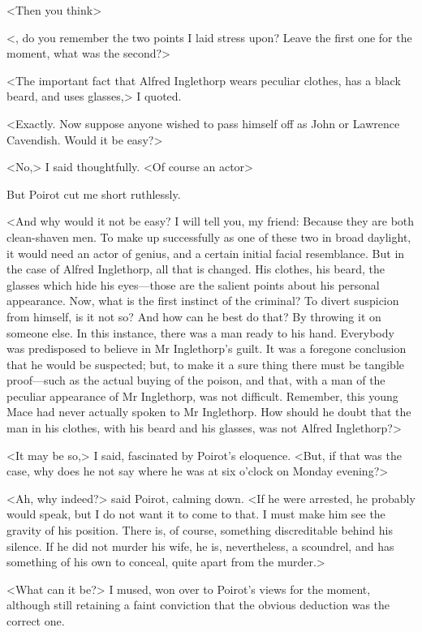  <Then you think\longdash> 

 <, do you remember the two points I laid stress upon? Leave the first one for the moment, what was the second?> 

 <The important fact that Alfred Inglethorp wears peculiar clothes, has a black beard, and uses glasses,> I quoted. 

 <Exactly. Now suppose anyone wished to pass himself off as John or Lawrence Cavendish. Would it be easy?> 

 <No,> I said thoughtfully. <Of course an actor\longdash> 

 But Poirot cut me short ruthlessly. 

 <And why would it not be easy? I will tell you, my friend: Because they are both clean-shaven men. To make up successfully as one of these two in broad daylight, it would need an actor of genius, and a certain initial facial resemblance. But in the case of Alfred Inglethorp, all that is changed. His clothes, his beard, the glasses which hide his eyes—those are the salient points about his personal appearance. Now, what is the first instinct of the criminal? To divert suspicion from himself, is it not so? And how can he best do that? By throwing it on someone else. In this instance, there was a man ready to his hand. Everybody was predisposed to believe in Mr Inglethorp's guilt. It was a foregone conclusion that he would be suspected; but, to make it a sure thing there must be tangible proof—such as the actual buying of the poison, and that, with a man of the peculiar appearance of Mr Inglethorp, was not difficult. Remember, this young Mace had never actually spoken to Mr Inglethorp. How should he doubt that the man in his clothes, with his beard and his glasses, was not Alfred Inglethorp?> 

 <It may be so,> I said, fascinated by Poirot's eloquence. <But, if that was the case, why does he not say where he was at six o'clock on Monday evening?> 

 <Ah, why indeed?> said Poirot, calming down. <If he were arrested, he probably would speak, but I do not want it to come to that. I must make him see the gravity of his position. There is, of course, something discreditable behind his silence. If he did not murder his wife, he is, nevertheless, a scoundrel, and has something of his own to conceal, quite apart from the murder.> 

 <What can it be?> I mused, won over to Poirot's views for the moment, although still retaining a faint conviction that the obvious deduction was the correct one. 

